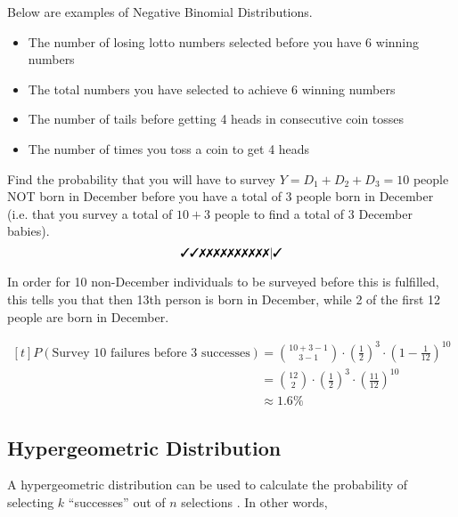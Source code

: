 \begin{example}
    Below are examples of Negative Binomial Distributions.

    \begin{itemize}
        \item The number of losing lotto numbers selected before you have 6 winning numbers 
        \item The total numbers you have selected to achieve 6 winning numbers 
        \item The number of tails before getting 4 heads in consecutive coin tosses 
        \item The number of times you toss a coin to get 4 heads 
    \end{itemize}
\end{example}

\begin{example}
    Find the probability that you will have to survey $Y = D_1 + D_2 + D_3 = 10$ people NOT born in December before you have a total of $3$ people born in December (i.e. that you survey a total of $10 + 3$ people to find a total of $3$ December babies).
    $$\cmark \cmark \xmark \xmark \xmark \xmark \xmark \xmark \xmark \xmark \xmark \xmark | \cmark$$

    In order for 10 non-December individuals to be surveyed before this is fulfilled, this tells you that then 13th person is born in December, while 2 of the first 12 people are born in December.

    $\begin{aligned}[t]
        P(\text{Survey } 10 \text{ failures before } 3 \text{ successes}) 
         & = \binom{10 + 3 - 1}{3 - 1} \cdot \left( \frac{1}{2} \right)^3 \cdot \left( 1 - \frac{1}{12} \right)^{10} \\
         & = \binom{12}{2} \cdot \left( \frac{1}{2} \right)^3 \cdot \left( \frac{11}{12} \right)^{10}                \\
         & \approx 1.6 \%
    \end{aligned}$
\end{example}

\subsection{Hypergeometric Distribution}

A hypergeometric distribution can be used to calculate the probability of selecting $k$ ``successes'' out of $n$ selections . In other words, 

